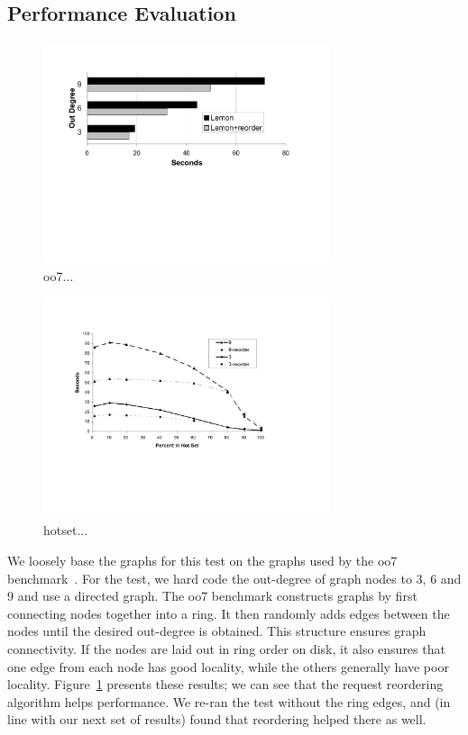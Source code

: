 \documentclass[10pt,letterpaper,twocolumn,english]{article}
\newcommand{\yad}{Lemon\xspace}
\begin{document}

\subsection {Performance Evaluation}

\begin{figure}[t]
\includegraphics[width=3.3in]{oo7.pdf}
\vspace{-15pt}
\caption{\sf\label{fig:oo7} oo7...}
\end{figure}

\begin{figure}[t]
\includegraphics[width=3.3in]{trans-closure-hotset.pdf}
\vspace{-12pt}
\caption{\sf\label{fig:hotGraph} hotset...}
\end{figure}

We loosely base the graphs for this test on the graphs used by the oo7
benchmark~\cite{oo7}.  For the test, we hard code the out-degree of
graph nodes to 3, 6 and 9 and use a directed graph.  The oo7 benchmark
constructs graphs by first connecting nodes together into a ring.  It
then randomly adds edges between the nodes until the desired out-degree
is obtained.  This structure ensures graph connectivity.  If the nodes
are laid out in ring order on disk, it also ensures that one edge
from each node has good locality, while the others generally have poor
locality.  
Figure~\ref{fig:oo7} presents these results;  we can see that the request reordering algorithm
helps performance.  We re-ran the test without the ring edges, and (in
line with our next set of results) found that reordering
helped there as well.
\end{document}
